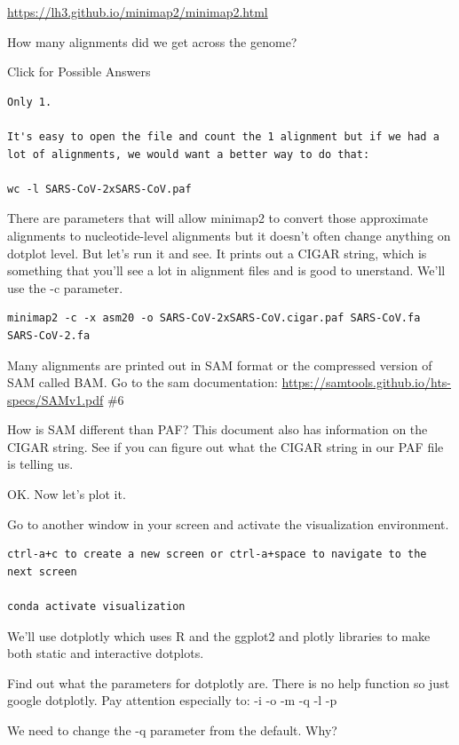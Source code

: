 \documentclass[
]{book}
\begin{document}
\url{https://lh3.github.io/minimap2/minimap2.html}

How many alignments did we get across the genome?

Click for Possible Answers

\begin{verbatim}
Only 1.

It's easy to open the file and count the 1 alignment but if we had a lot of alignments, we would want a better way to do that:

wc -l SARS-CoV-2xSARS-CoV.paf
\end{verbatim}

\hfill\break

There are parameters that will allow minimap2 to convert those approximate alignments to nucleotide-level alignments but it doesn't often change anything on dotplot level. But let's run it and see. It prints out a CIGAR string, which is something that you'll see a lot in alignment files and is good to unerstand. We'll use the -c parameter.

\begin{verbatim}
minimap2 -c -x asm20 -o SARS-CoV-2xSARS-CoV.cigar.paf SARS-CoV.fa SARS-CoV-2.fa
\end{verbatim}

Many alignments are printed out in SAM format or the compressed version of SAM called BAM. Go to the sam documentation:
\url{https://samtools.github.io/hts-specs/SAMv1.pdf} \#6

How is SAM different than PAF? This document also has information on the CIGAR string. See if you can figure out what the CIGAR string in our PAF file is telling us.

OK. Now let's plot it.

Go to another window in your screen and activate the visualization environment.

\begin{verbatim}
ctrl-a+c to create a new screen or ctrl-a+space to navigate to the next screen

conda activate visualization
\end{verbatim}

We'll use dotplotly which uses R and the ggplot2 and plotly libraries to make both static and interactive dotplots.

Find out what the parameters for dotplotly are. There is no help function so just google dotplotly. Pay attention especially to:
-i
-o
-m
-q
-l
-p

We need to change the -q parameter from the default. Why?
\end{document}
